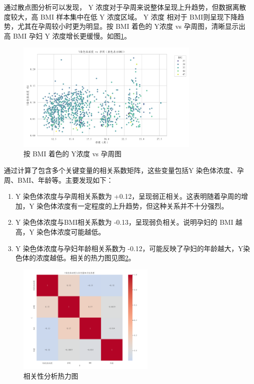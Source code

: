 \documentclass[withoutpreface,bwprint]{cumcmthesis} %
\begin{document}
通过散点图分析可以发现， Y 浓度对于孕周来说整体呈现上升趋势，但数据离散度较大，高 BMI 样本集中在低 Y 浓度区域。 Y 浓度 相对于 BMI则呈现下降趋势，尤其在孕周较小时更为明显。按 BMI 着色的 Y浓度 vs 孕周图，清晰显示出高 BMI 孕妇 Y 浓度增长更缓慢。如图\ref{fig:YandWbyBMI}。

\begin{figure}[H]
    \centering
    \includegraphics[width=0.8\textwidth]{../figure/q1_scatter_y_vs_gw_by_bmi.png}
    \caption{按 BMI 着色的 Y浓度 vs 孕周图}
    \label{fig:YandWbyBMI}
\end{figure}

通过计算了包含多个关键变量的相关系数矩阵，这些变量包括Y 染色体浓度、孕周、BMI、年龄等。主要发现如下：
\begin{enumerate}
    \item Y 染色体浓度与孕周相关系数为 +0.12，呈现弱正相关。这表明随着孕周的增加，Y 染色体浓度有一定程度的上升趋势，但这种关系并不十分强烈。
    \item Y 染色体浓度与BMI相关系数为 -0.13，呈现弱负相关。说明孕妇的 BMI 越高，Y 染色体浓度可能越低。
    \item Y 染色体浓度与孕妇年龄相关系数为 -0.12，可能反映了孕妇的年龄越大，Y染色体的浓度越低。相关的热力图见图\ref{fig:heatmap}。
\end{enumerate}


\begin{figure}[H]
    \centering
    \includegraphics[width=0.6\textwidth]{../figure/q1_correlation_heatmap.png}
    \caption{相关性分析热力图}
    \label{fig:heatmap}
\end{figure}
\end{document}
